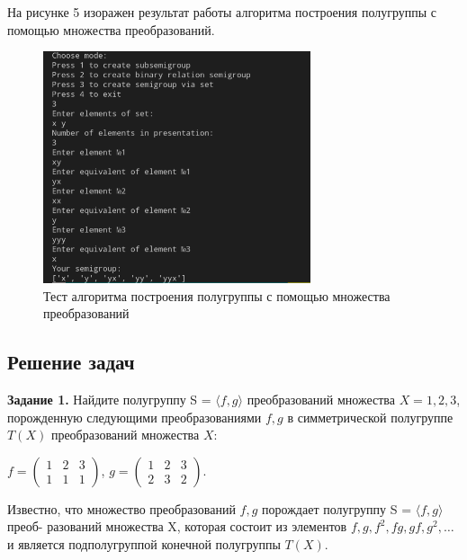 \documentclass[bachelor, och, labwork]{shiza}
\begin{document}
      На рисунке 5 изоражен результат работы алгоритма построения полугруппы с помощью множества преобразований.

      \begin{figure}[H]
        \centering
        \includegraphics[width=0.7\textwidth]{photo/5.png}
        \caption{Тест алгоритма построения полугруппы с помощью множества преобразований}
      \end{figure}

    \subsection{Решение задач}
      \textbf{Задание 1.} Найдите полугруппу S = $\langle f, g \rangle$ преобразований множества $X = {1, 2, 3}$,
      порожденную следующими преобразованиями $f, g$ в симметрической полугруппе $T(X)$ преобразований множества $X$:
      \begin{center}
        $f = \begin{pmatrix}
          1 & 2 & 3 \\
          1 & 1 & 1
      \end{pmatrix}$,
        $g = \begin{pmatrix}
          1 & 2 & 3 \\
          2 & 3 & 2
        \end{pmatrix}$.
      \end{center}
    Известно, что множество преобразований $f, g$ порождает полугруппу S = $\langle f, g \rangle$ преоб-
    разований множества X, которая состоит из элементов $f, g, f^2 , fg, gf, g^2 , \dots $ и
    является подполугруппой конечной полугруппы $T(X)$.
\end{document}
